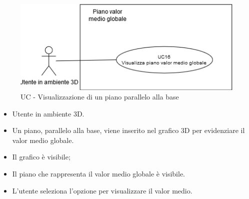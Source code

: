 \begin{figure}[h!]\centering
    \includegraphics[scale=0.7]{template/images/UC16.png}
    \caption{UC - Visualizzazione di un piano parallelo alla base}
\end{figure}
\UCdsc
{ %
    \begin{itemize}
        \item Utente in ambiente 3D.
    \end{itemize}
}
{ %
    \begin{itemize}
        \item Un piano, parallelo alla base, viene inserito nel grafico 3D per evidenziare il valor medio globale.
    \end{itemize}
}
{ %
    \begin{itemize}
        \item Il grafico è visibile;
    \end{itemize}
}
{ %
    \begin{itemize}
        \item Il piano che rappresenta il valor medio globale è visibile.
    \end{itemize}
}
{ %
    \begin{itemize}
        \item L'utente seleziona l'opzione per visualizzare il valor medio.
    \end{itemize}
}


